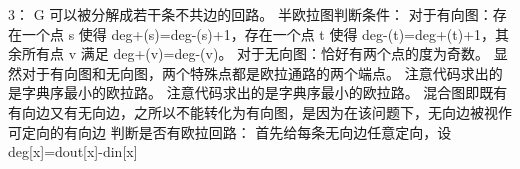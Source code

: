 {}3：\markdownRendererDollarSign{} G \markdownRendererDollarSign{}可以被分解成若干条不共边的回路。\markdownRendererParagraphSeparator
{}半欧拉图判断条件：\markdownRendererParagraphSeparator
{}对于有向图：存在一个点 \markdownRendererDollarSign{}s\markdownRendererDollarSign{} 使得 \markdownRendererDollarSign{}\markdownRendererBackslash{}deg\markdownRendererCircumflex{}\markdownRendererLeftBrace{}+\markdownRendererRightBrace{}(s)=\markdownRendererBackslash{}deg\markdownRendererCircumflex{}\markdownRendererLeftBrace{}-\markdownRendererRightBrace{}(s)+1\markdownRendererDollarSign{}，存在一个点 \markdownRendererDollarSign{}t\markdownRendererDollarSign{} 使得 \markdownRendererDollarSign{}\markdownRendererBackslash{}deg\markdownRendererCircumflex{}\markdownRendererLeftBrace{}-\markdownRendererRightBrace{}(t)=\markdownRendererBackslash{}deg\markdownRendererCircumflex{}\markdownRendererLeftBrace{}+\markdownRendererRightBrace{}(t)+1\markdownRendererDollarSign{}，其余所有点 \markdownRendererDollarSign{}v\markdownRendererDollarSign{} 满足 \markdownRendererDollarSign{}\markdownRendererBackslash{}deg\markdownRendererCircumflex{}\markdownRendererLeftBrace{}+\markdownRendererRightBrace{}(v)=\markdownRendererBackslash{}deg\markdownRendererCircumflex{}\markdownRendererLeftBrace{}-\markdownRendererRightBrace{}(v)\markdownRendererDollarSign{}。\markdownRendererParagraphSeparator
{}对于无向图：恰好有两个点的度为奇数。\markdownRendererParagraphSeparator
{}显然对于有向图和无向图，两个特殊点都是欧拉通路的两个端点。\markdownRendererInterblockSeparator
{}\markdownRendererSectionBegin
{}\markdownRendererInterblockSeparator
{}注意代码求出的是字典序最小的欧拉路。\markdownRendererInterblockSeparator
{}\markdownRendererInterblockSeparator
{}
\markdownRendererSectionEnd \markdownRendererSectionBegin
{}\markdownRendererInterblockSeparator
{}注意代码求出的是字典序最小的欧拉路。\markdownRendererInterblockSeparator
{}\markdownRendererInterblockSeparator
{}
\markdownRendererSectionEnd \markdownRendererSectionBegin
{}\markdownRendererInterblockSeparator
{}混合图即既有有向边又有无向边，之所以不能转化为有向图，是因为在该问题下，无向边被视作可定向的有向边\markdownRendererParagraphSeparator
{}判断是否有欧拉回路：\markdownRendererParagraphSeparator
{}首先给每条无向边任意定向，设\markdownRendererDollarSign{} deg[x]=dout[x]-din[x] \markdownRendererDollarSign{}\markdownRendererParagraphSeparator
